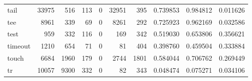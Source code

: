 \begin{longtable}{lrrrrrrrrr}
tail      &                                              33975 &                                                516 &                                                113 &                                                  0 &                                              32951 &                                                395 &                                           0.739853 &                               0.984812 &                             0.011626 \\
tee       &                                               8961 &                                                339 &                                                 69 &                                                  0 &                                               8261 &                                                292 &                                           0.725923 &                               0.962169 &                             0.032586 \\
test      &                                                959 &                                                332 &                                                116 &                                                  0 &                                                169 &                                                342 &                                           0.519030 &                               0.653806 &                             0.356621 \\
timeout   &                                               1210 &                                                654 &                                                 71 &                                                  0 &                                                 81 &                                                404 &                                           0.398760 &                               0.459504 &                             0.333884 \\
touch     &                                               6684 &                                               1960 &                                                179 &                                                  0 &                                               2744 &                                               1801 &                                           0.584044 &                               0.706762 &                             0.269449 \\
tr        &                                              10057 &                                               9300 &                                                332 &                                                  0 &                                                 82 &                                                343 &                                           0.048474 &                               0.075271 &                             0.034106 \\

\end{longtable}
